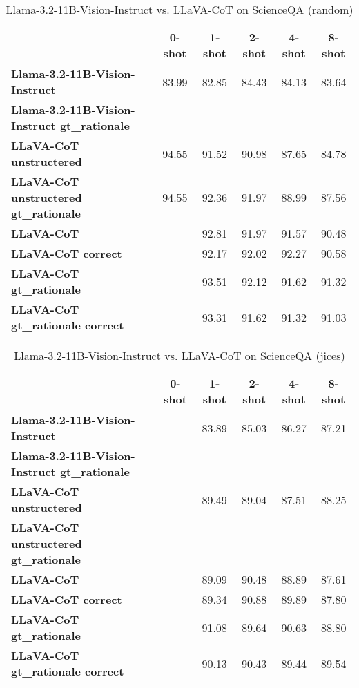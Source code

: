 \begin{table}
\caption{Llama-3.2-11B-Vision-Instruct vs. LLaVA-CoT on ScienceQA (random)}
\label{tab:Llama-3.2-11B-Vision-Instruct_ScienceQA_TRAIN_random}
\begin{tabular}{lccccc}
\toprule
 & 0-shot & 1-shot & 2-shot & 4-shot & 8-shot \\
\midrule
\textbf{Llama-3.2-11B-Vision-Instruct} & 83.99 & 82.85 & 84.43 & 84.13 & 83.64 \\
\textbf{Llama-3.2-11B-Vision-Instruct gt\_rationale} &  &  &  &  &  \\
\textbf{LLaVA-CoT unstructered} & 94.55 & 91.52 & 90.98 & 87.65 & 84.78 \\
\textbf{LLaVA-CoT unstructered gt\_rationale} & 94.55 & 92.36 & 91.97 & 88.99 & 87.56 \\
\textbf{LLaVA-CoT} &  & 92.81 & 91.97 & 91.57 & 90.48 \\
\textbf{LLaVA-CoT correct} &  & 92.17 & 92.02 & 92.27 & 90.58 \\
\textbf{LLaVA-CoT gt\_rationale} &  & 93.51 & 92.12 & 91.62 & 91.32 \\
\textbf{LLaVA-CoT gt\_rationale correct} &  & 93.31 & 91.62 & 91.32 & 91.03 \\
\bottomrule
\end{tabular}
\end{table}


\begin{table}
\caption{Llama-3.2-11B-Vision-Instruct vs. LLaVA-CoT on ScienceQA (jices)}
\label{tab:Llama-3.2-11B-Vision-Instruct_ScienceQA_TRAIN_jices}
\begin{tabular}{lccccc}
\toprule
 & 0-shot & 1-shot & 2-shot & 4-shot & 8-shot \\
\midrule
\textbf{Llama-3.2-11B-Vision-Instruct} &  & 83.89 & 85.03 & 86.27 & 87.21 \\
\textbf{Llama-3.2-11B-Vision-Instruct gt\_rationale} &  &  &  &  &  \\
\textbf{LLaVA-CoT unstructered} &  & 89.49 & 89.04 & 87.51 & 88.25 \\
\textbf{LLaVA-CoT unstructered gt\_rationale} &  &  &  &  &  \\
\textbf{LLaVA-CoT} &  & 89.09 & 90.48 & 88.89 & 87.61 \\
\textbf{LLaVA-CoT correct} &  & 89.34 & 90.88 & 89.89 & 87.80 \\
\textbf{LLaVA-CoT gt\_rationale} &  & 91.08 & 89.64 & 90.63 & 88.80 \\
\textbf{LLaVA-CoT gt\_rationale correct} &  & 90.13 & 90.43 & 89.44 & 89.54 \\
\bottomrule
\end{tabular}
\end{table}


